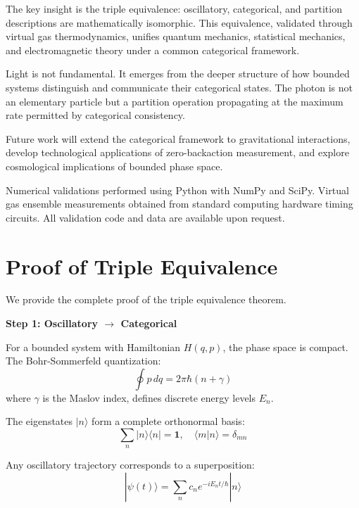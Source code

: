 \documentclass[aps,prl,twocolumn,superscriptaddress,floatfix]{revtex4-2}
\begin{document}
The key insight is the triple equivalence: oscillatory, categorical, and partition descriptions are mathematically isomorphic. This equivalence, validated through virtual gas thermodynamics, unifies quantum mechanics, statistical mechanics, and electromagnetic theory under a common categorical framework.

Light is not fundamental. It emerges from the deeper structure of how bounded systems distinguish and communicate their categorical states. The photon is not an elementary particle but a partition operation propagating at the maximum rate permitted by categorical consistency.

Future work will extend the categorical framework to gravitational interactions, develop technological applications of zero-backaction measurement, and explore cosmological implications of bounded phase space.

\begin{acknowledgments}
Numerical validations performed using Python with NumPy and SciPy. Virtual gas ensemble measurements obtained from standard computing hardware timing circuits. All validation code and data are available upon request.
\end{acknowledgments}

\appendix

\section{Proof of Triple Equivalence}

We provide the complete proof of the triple equivalence theorem.

\textbf{Step 1: Oscillatory $\to$ Categorical}

For a bounded system with Hamiltonian $H(q,p)$, the phase space is compact. The Bohr-Sommerfeld quantization:
\begin{equation}
\oint p \, dq = 2\pi\hbar(n + \gamma)
\end{equation}
where $\gamma$ is the Maslov index, defines discrete energy levels $E_n$.

The eigenstates $|n\rangle$ form a complete orthonormal basis:
\begin{equation}
\sum_n |n\rangle\langle n| = \mathbf{1}, \quad \langle m|n\rangle = \delta_{mn}
\end{equation}

Any oscillatory trajectory corresponds to a superposition:
\begin{equation}
|\psi(t)\rangle = \sum_n c_n e^{-iE_n t/\hbar} |n\rangle
\end{equation}
\end{document}
